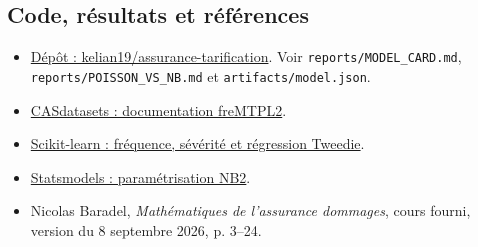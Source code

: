 \documentclass[11pt,a4paper]{article}
\begin{document}
\subsection*{Code, résultats et références}
\small
\begin{itemize}[itemsep=2pt]
\item \href{https://github.com/kelian19/assurance-tarification}{Dépôt : kelian19/assurance-tarification}. Voir \texttt{reports/MODEL\_CARD.md}, \texttt{reports/POISSON\_VS\_NB.md} et \texttt{artifacts/model.json}.
\item \href{https://dutangc.github.io/CASdatasets/reference/freMTPL.html}{CASdatasets : documentation freMTPL2}.
\item \href{https://scikit-learn.org/stable/auto_examples/linear_model/plot_tweedie_regression_insurance_claims.html}{Scikit-learn : fréquence, sévérité et régression Tweedie}.
\item \href{https://www.statsmodels.org/stable/generated/statsmodels.discrete.discrete_model.NegativeBinomial.html}{Statsmodels : paramétrisation NB2}.
\item Nicolas Baradel, \emph{Mathématiques de l'assurance dommages}, cours fourni, version du 8 septembre 2026, p. 3--24.
\end{itemize}
\end{document}
